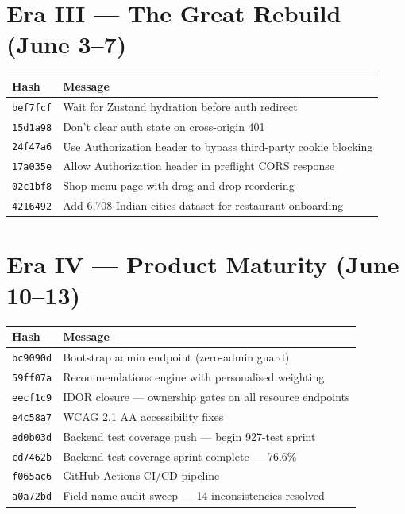 \documentclass[11pt,a4paper,twoside]{book}
\newcommand{\th}[1]{\textbf{\color{white}#1}}
\begin{document}
\section{Era III — The Great Rebuild (June 3–7)}

\begin{center}\footnotesize
\begin{longtable}{p{2cm}p{10.5cm}}
\toprule
\rowcolor{headbg}\th{Hash} & \th{Message} \\
\midrule
\texttt{bef7fcf} & Wait for Zustand hydration before auth redirect \\
\rowcolor{rowalt}\texttt{15d1a98} & Don't clear auth state on cross-origin 401 \\
\texttt{24f47a6} & Use Authorization header to bypass third-party cookie blocking \\
\rowcolor{rowalt}\texttt{17a035e} & Allow Authorization header in preflight CORS response \\
\texttt{02c1bf8} & Shop menu page with drag-and-drop reordering \\
\rowcolor{rowalt}\texttt{4216492} & Add 6,708 Indian cities dataset for restaurant onboarding \\
\bottomrule
\end{longtable}
\end{center}

\section{Era IV — Product Maturity (June 10–13)}

\begin{center}\footnotesize
\begin{longtable}{p{2cm}p{10.5cm}}
\toprule
\rowcolor{headbg}\th{Hash} & \th{Message} \\
\midrule
\texttt{bc9090d} & Bootstrap admin endpoint (zero-admin guard) \\
\rowcolor{rowalt}\texttt{59ff07a} & Recommendations engine with personalised weighting \\
\texttt{eecf1c9} & IDOR closure — ownership gates on all resource endpoints \\
\rowcolor{rowalt}\texttt{e4c58a7} & WCAG 2.1 AA accessibility fixes \\
\texttt{ed0b03d} & Backend test coverage push — begin 927-test sprint \\
\rowcolor{rowalt}\texttt{cd7462b} & Backend test coverage sprint complete — 76.6\% \\
\texttt{f065ac6} & GitHub Actions CI/CD pipeline \\
\rowcolor{rowalt}\texttt{a0a72bd} & Field-name audit sweep — 14 inconsistencies resolved \\
\bottomrule
\end{longtable}
\end{center}
\end{document}
